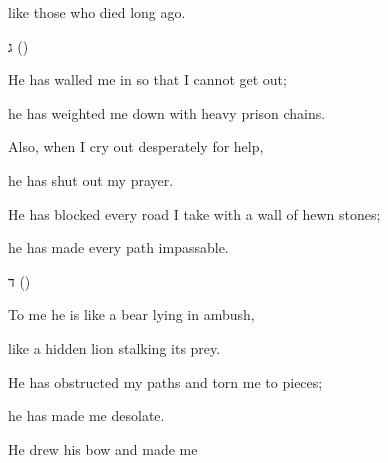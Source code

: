 {\par }{\Q like those who
died
long ago.
\par }{\SH ג ({})
\par }{\Q {}He has walled me in so that I cannot get out;
\par }{\Q he has weighted me down with heavy prison chains.
\par }{\Q {}Also,
when
I cry out
desperately
for help,
\par }{\Q he has shut out
my prayer.
\par }{\Q {}He has blocked
every road
I take with a wall of hewn stones;
\par }{\Q he has made
every path
impassable.
\par }{\SH ד ({})
\par }{\Q {}To me he is like a bear lying in ambush,
\par }{\Q like a hidden lion stalking its prey.
\par }{\Q {}He has obstructed
my paths
and torn me to pieces;

\par }{\Q he has made
me desolate.
\par }{\Q {}He drew
his bow
and made me

}

